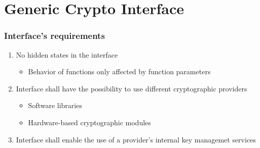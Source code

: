 \section{Generic Crypto Interface}

\begin{frame}

\frametitle{Interface's requirements}

\begin{enumerate} 
  \item No hidden states in the interface
  
  \begin{itemize}
  	\item Behavior of functions only affected by function parameters
  \end{itemize}
    
  \item Interface shall have the possibility to use different
  cryptographic providers
  
  \begin{itemize}
  	\item Software libraries
  	\item Hardware-based cryptographic modules
  \end{itemize}
  
  \item Interface shall enable the use of a provider's internal key managemet services
  	  
\end{enumerate}

\end{frame}

